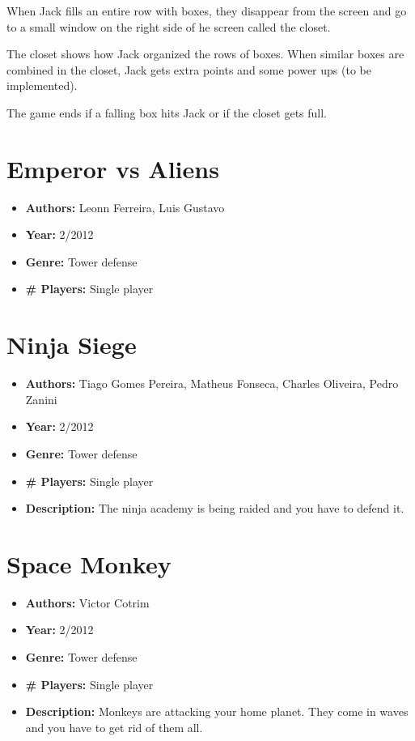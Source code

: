 \begin{apendicesenv}
\begin{itemize}
When Jack fills an entire row with boxes, they disappear from the screen and go to a small window on the right side of he screen called the closet.

The closet shows how Jack organized the rows of boxes. When similar boxes are combined in the closet, Jack gets extra points and some power ups (to be implemented).

The game ends if a falling box hits Jack or if the closet gets full.

\end{itemize}

\section{Emperor vs Aliens}
\label {sec:emperor}

\begin{itemize}
\item[] \textbf{Authors:} Leonn Ferreira, Luis Gustavo
\item[] \textbf{Year:} 2/2012
\item[] \textbf{Genre:} Tower defense
\item[] \textbf{\# Players:} Single player
\end{itemize}

\section{Ninja Siege}
\label {sec:ninja_siege}

\begin{itemize}
\item[] \textbf{Authors:} Tiago Gomes Pereira, Matheus Fonseca, Charles Oliveira, Pedro Zanini
\item[] \textbf{Year:} 2/2012
\item[] \textbf{Genre:} Tower defense
\item[] \textbf{\# Players:} Single player
\item[] \textbf{Description:} The ninja academy is being raided and you have to defend it.
\end{itemize}


\section{Space Monkey}
\label {sec:space_monkey}

\begin{itemize}
\item[] \textbf{Authors:} Victor Cotrim
\item[] \textbf{Year:} 2/2012
\item[] \textbf{Genre:} Tower defense
\item[] \textbf{\# Players:} Single player
\item[] \textbf{Description:} Monkeys are attacking your home planet. They come in waves and you have to get rid of them all.
\end{itemize}


\end{apendicesenv}
